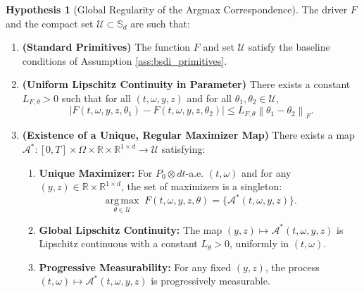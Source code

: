 \documentclass[12pt, letterpaper]{amsart}
\newcommand{\Thetacal}{\mathcal{A}}
\newcommand{\Ucal}{\mathcal{U}}
\newcommand{\Sd}{\mathbb{S}_d}
\newcommand{\R}{\mathbb{R}}
\newcommand{\norm}[1]{\left\lVert#1\right\rVert}
\DeclareMathOperator*{\argmax}{arg\,max}
\theoremstyle{plain}
\theoremstyle{definition}
\newtheorem{hypothesis}[theorem]{Hypothesis}
\theoremstyle{remark}
\numberwithin{equation}{section} %
\begin{document}
\begin{hypothesis}[Global Regularity of the Argmax Correspondence]\label{hyp:global_regularity}
The driver $F$ and the compact set $\Ucal \subset \Sd$ are such that:
\begin{enumerate}[label=(\roman*)]
    \item \textbf{(Standard Primitives)} The function $F$ and set $\Ucal$ satisfy the baseline conditions of Assumption \ref{ass:bsdi_primitives}.
    
    \item \textbf{(Uniform Lipschitz Continuity in Parameter)} There exists a constant $L_{F,\theta} > 0$ such that for all $(t,\omega,y,z)$ and for all $\theta_1, \theta_2 \in \Ucal$,
    \[ |F(t,\omega,y,z,\theta_1) - F(t,\omega,y,z,\theta_2)| \le L_{F,\theta} \norm{\theta_1 - \theta_2}_F. \]

    \item \textbf{(Existence of a Unique, Regular Maximizer Map)} There exists a map $\Thetacal^*: [0,T]\times\Omega\times\R\times\R^{1\times d} \to \Ucal$ satisfying:
        \begin{enumerate}[label=(\alph*)]
            \item \textbf{Unique Maximizer:} For $P_0\otimes dt$-a.e. $(t,\omega)$ and for any $(y,z) \in \R\times\R^{1\times d}$, the set of maximizers is a singleton:
            \[ \underset{\theta \in \Ucal}{\argmax} \; F(t, \omega, y, z, \theta) = \{\Thetacal^*(t,\omega,y,z)\}. \]
            \item \textbf{Global Lipschitz Continuity:} The map $(y,z) \mapsto \Thetacal^*(t,\omega,y,z)$ is Lipschitz continuous with a constant $L_\theta > 0$, uniformly in $(t,\omega)$.
            \item \textbf{Progressive Measurability:} For any fixed $(y,z)$, the process $(t,\omega) \mapsto \Thetacal^*(t,\omega,y,z)$ is progressively measurable.
        \end{enumerate}
\end{enumerate}
\end{hypothesis}
\end{document}
